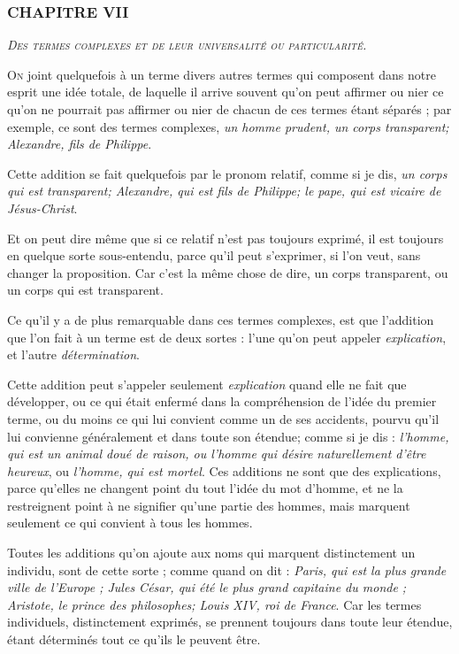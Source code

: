 \subsubsection{\centering \Large CHAPITRE VII}
\begin{center}\emph{\large\scshape Des termes complexes et de leur universalité ou particularité.}\end{center}

	\lettrine{O}{n} joint quelquefois à un terme divers autres termes qui composent dans notre esprit une idée totale, de laquelle il arrive souvent qu'on peut affirmer ou nier ce qu'on ne pourrait pas affirmer ou nier de chacun de ces termes étant séparés ; par exemple, ce sont des termes complexes, \emph{un homme prudent, un corps transparent; Alexandre, fils de Philippe}.

Cette addition se fait quelquefois par le pronom relatif, comme si je dis, \emph{un corps qui est transparent; Alexandre, qui est fils de Philippe; le pape, qui est vicaire de Jésus-Christ}.

Et on peut dire même que si ce relatif n'est pas toujours exprimé, il est toujours en quelque sorte sous-entendu, parce qu'il peut s'exprimer, si l'on veut, sans changer la proposition. Car c'est la même chose de dire, un corps transparent, ou un corps qui est transparent.

Ce qu'il y a de plus remarquable dans ces termes complexes, est que l'addition que l'on fait à un terme est de deux sortes : l'une qu'on peut appeler \emph{explication}, et l'autre \emph{détermination}.

Cette addition peut s'appeler seulement \emph{explication} quand elle ne fait que développer, ou ce qui était enfermé dans la compréhension de l'idée du premier terme, ou du moins ce qui lui convient comme un de ses accidents, pourvu qu'il lui convienne généralement et dans toute son étendue; comme si je dis : \emph{l'homme, qui est un animal doué de raison, ou l'homme qui désire naturellement d'être heureux}, ou \emph{l'homme, qui est mortel}. Ces additions ne sont que des explications, parce qu'elles ne changent point du tout l'idée du mot d'homme, et ne la restreignent point à ne signifier qu'une partie des hommes, mais marquent seulement ce qui convient à tous les hommes.

Toutes les additions qu'on ajoute aux noms qui marquent distinctement un individu, sont de cette sorte ; comme quand on dit : \emph{Paris, qui est la plus grande ville de l'Europe ; Jules César, qui été le plus grand capitaine du monde ; Aristote, le prince des philosophes; Louis XIV, roi de France}. Car les termes individuels, distinctement exprimés, se prennent toujours dans toute leur étendue, étant déterminés tout ce qu'ils le peuvent être.

